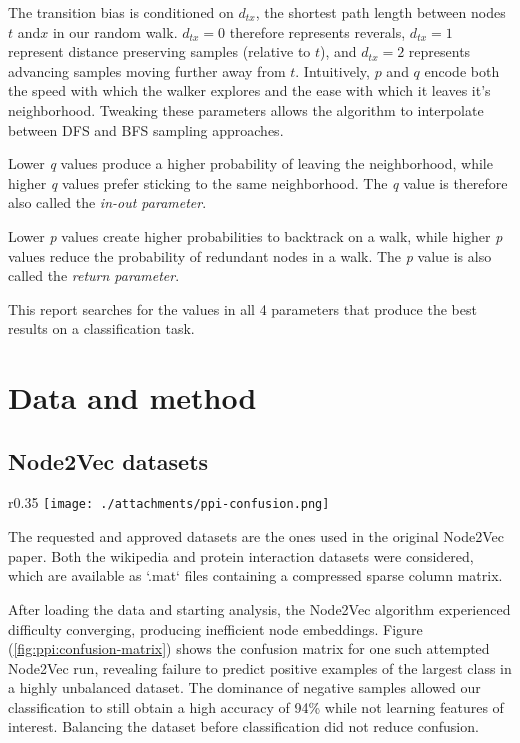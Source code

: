 \documentclass[a4paper,10pt]{article}
\begin{document}
The transition bias is conditioned on $d_{tx}$, the shortest path length between nodes $t$ and$x$ in our random walk. $d_{tx} = 0$ therefore represents reverals, $d_{tx} = 1$ represent distance preserving samples (relative to $t$), and $d_{tx} = 2$ represents advancing samples moving further away from $t$. Intuitively, $p$ and $q$ encode both the speed with which the walker explores and the ease with which it leaves it's neighborhood. Tweaking these parameters allows the algorithm to interpolate between DFS and BFS sampling approaches.

Lower \textit{q} values produce a higher probability of leaving the neighborhood, while higher \textit{q} values prefer sticking to the same neighborhood. The \textit{q} value is therefore also called the \textit{in-out parameter}.

Lower \textit{p} values create higher probabilities to backtrack on a walk, while higher \textit{p} values reduce the probability of redundant nodes in a walk. The \textit{p} value is also called the \textit{return parameter}.

This report searches for the values in all 4 parameters that produce the best results on a classification task.

\section{Data and method}

\subsection{Node2Vec datasets}

\begin{wrapfigure}{r}{0.35\textwidth}
  \centering
  \vspace{-8mm}
      \texttt{[image: ./attachments/ppi-confusion.png]}
        \caption{Confusion matrix for PPI dataset}
        \label{fig:ppi:confusion-matrix}
\end{wrapfigure}

The requested and approved datasets are the ones used in the original Node2Vec paper. Both the wikipedia and protein interaction datasets were considered, which are available as `.mat` files containing a compressed sparse column matrix.

After loading the data and starting analysis, the Node2Vec algorithm experienced difficulty converging, producing inefficient node embeddings. Figure (\ref{fig:ppi:confusion-matrix}) shows the confusion matrix for one such attempted Node2Vec run, revealing failure to predict positive examples of the largest class in a highly unbalanced dataset. The dominance of negative samples allowed our classification to still obtain a high accuracy of 94\% while not learning features of interest. Balancing the dataset before classification did not reduce confusion.
\end{document}
